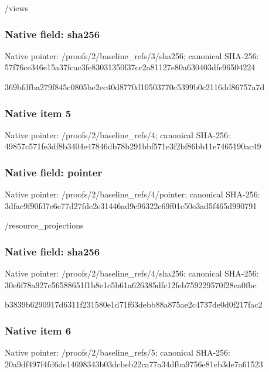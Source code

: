 \documentclass[10pt,a4paper]{article}
\begin{document}
/views


\subsubsection{Native field: sha256}


Native pointer: /proofs/2/baseline\_refs/3/sha256; canonical SHA-256: 57f76ce346e15a37fcac3fe8\allowbreak{}3031350f37cc2a81127e80a6\allowbreak{}30403dfe96504224


369bfdfba279f845c0805be2\allowbreak{}ec40d8770d10503770c5399b\allowbreak{}0c2116dd86757a7d


\subsubsection{Native item 5}


Native pointer: /proofs/2/baseline\_refs/4; canonical SHA-256: 49857c571fe3df8b3404e478\allowbreak{}46db78b291bbf571e3f2bf86\allowbreak{}bb11e7465190ac49



\subsubsection{Native field: pointer}


Native pointer: /proofs/2/baseline\_refs/4/pointer; canonical SHA-256: 3dfac9f90fd7e6e77d27fde2\allowbreak{}e31446ad9c96322c69f01c50\allowbreak{}e3ad5f465d990791


/resource\_projections


\subsubsection{Native field: sha256}


Native pointer: /proofs/2/baseline\_refs/4/sha256; canonical SHA-256: 30e6f78a927c56588651f1b8\allowbreak{}e1c5b61a626385dfc12feb75\allowbreak{}9229570f28ea0fbc


b3839b6290917d6311f23158\allowbreak{}0e1d71f63debb88a875ae2c4\allowbreak{}737de0d0f217fac2


\subsubsection{Native item 6}


Native pointer: /proofs/2/baseline\_refs/5; canonical SHA-256: 20a9df497f4fd6de14698343\allowbreak{}b03dcbeb22ca77a34dfba975\allowbreak{}6e81eb3de7a61523
\end{document}
